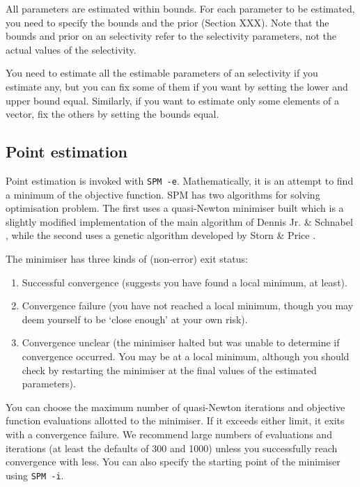 All parameters are estimated within bounds. For each parameter to be estimated, you need to specify the bounds and the prior (Section XXX). Note that the bounds and prior on an selectivity refer to the selectivity parameters, not the actual values of the selectivity. 

You need to estimate all the estimable parameters of an selectivity if you estimate any, but you can fix some of them if you want by setting the lower and upper bound equal. Similarly, if you want to estimate only some elements of a vector, fix the others by setting the bounds equal.

\subsection{Point estimation}

Point estimation is invoked with \texttt{SPM -e}. Mathematically, it is an attempt to find a minimum of the objective function. SPM has two algorithms for solving optimisation problem. The first uses a quasi-Newton minimiser built which is a slightly modified implementation of the main algorithm of Dennis Jr. \& Schnabel \citep{779}, while the second uses a genetic algorithm developed by Storn \& Price \citep{1442}.

The minimiser has three kinds of (non-error) exit status: 

\begin{enumerate}
\item Successful convergence (suggests you have found a local minimum, at least).
\item Convergence failure (you have not reached a local minimum, though you may deem yourself to be `close enough' at your own risk).
\item Convergence unclear (the minimiser halted but was unable to determine if convergence occurred. You may be at a local minimum, although you should check by restarting the minimiser at the final values of the estimated parameters).
\end{enumerate}

You can choose the maximum number of quasi-Newton iterations and objective function evaluations allotted to the minimiser. If it exceeds either limit, it exits with a convergence failure. We recommend large numbers of evaluations and iterations (at least the defaults of 300 and 1000) unless you successfully reach convergence with less. You can also specify the starting point of the minimiser using \texttt{SPM -i}.


